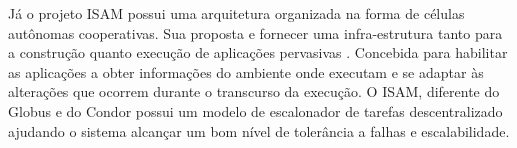 Já o projeto ISAM \cite{isam} possui uma arquitetura organizada na forma de células autônomas cooperativas. Sua proposta e fornecer uma infra-estrutura tanto para a construção quanto execução de aplicações pervasivas \cite {site do isam}. Concebida para habilitar as aplicações a obter informações do ambiente onde executam e se adaptar às alterações que ocorrem durante o transcurso da execução. O ISAM, diferente do Globus e do Condor possui um modelo de escalonador de tarefas descentralizado ajudando o sistema alcançar um bom nível de tolerância a falhas e escalabilidade.

